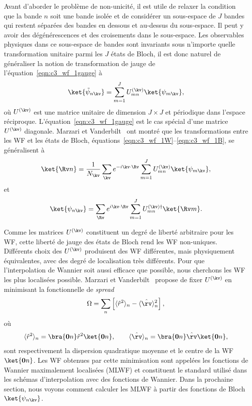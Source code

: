 Avant d'aborder le problème de non-unicité, il est utile de relaxer la condition que la bande $n$ soit une bande isolée et de considérer un sous-espace de $J$ bandes qui restent séparées des bandes en dessous et au-dessus du sous-espace. Il peut y avoir des dégénérescences et des croisements dans le sous-espace. Les observables physiques dans ce sous-espace de bandes sont invariants sous n'importe quelle transformation unitaire parmi les $J$ états de Bloch, il est donc naturel de généraliser la notion de transformation de jauge de l'équation~\eqref{eqn:c3_wf_1gauge} à
\begin{equation}
    \ket{\tilde{\psi}_{n\kv}}=\sum_{m=1}^J U_{mn}^{(\kv)}\ket{\psi_{m\kv}},
\end{equation}
où $U^{(\kv)}$ est une matrice unitaire de dimension $J\times J$ et périodique dans l'espace réciproque. L'équation~\eqref{eqn:c3_wf_1gauge} est le cas spécial d'une matrice $U^{(\kv)}$ diagonale. Marzari et Vanderbilt~\cite{marzariMaximallyLocalizedGeneralized1997} ont montré que les transformations entre les WF et les états de Bloch, équations~\eqref{eqn:c3_wf_1W}--\eqref{eqn:c3_wf_1B}, se généralisent à
\begin{equation}
    \ket{\Rv n} = \frac{1}{N_\kv}\sum_{\kv}e^{-i\kv\cdot\Rv}\sum_{m=1}^JU_{mn}^{(\kv)}\ket{\psi_{m\kv}},
\end{equation}
et
\begin{equation}
    \ket{\psi_{n\kv}}=\sum_{\Rv}e^{i\kv\cdot\Rv}\sum_{m=1}^J U_{mn}^{(\kv)\dag}\ket{\Rv m}.
\end{equation}

Comme les matrices $U^{(\kv)}$ constituent un degré de liberté arbitraire pour les WF, cette liberté de jauge des états de Bloch rend les WF non-uniques. Différents choix des $U^{(\kv)}$ produisent des WF différentes, mais physiquement équivalentes, avec des degré de localisation très différents. Pour que l'interpolation de Wannier soit aussi efficace que possible, nous cherchons les WF les plus localisées possible. Marzari et Vanderbilt~\cite{marzariMaximallyLocalizedGeneralized1997} propose de fixer $U^{(\kv)}$ en minimisant la fonctionnelle de \textit{spread}
\begin{equation}
    \Omega = \sum_n\left[\langle \hat{r}^2\rangle_n - \langle \hat{\rv} \rangle^2_n\right],
\end{equation}
où 
\begin{equation}
    \langle \hat{r}^2\rangle_n = \bra{\mathbf{0}n}\hat{r}^2\ket{\mathbf{0}n},\qquad\langle \hat{\rv} \rangle_n = \bra{\mathbf{0}n}\hat{\rv}\ket{\mathbf{0}n},
\end{equation}
sont respectivement la dispersion quadratique moyenne et le centre de la WF $\ket{\mathbf{0}n}$. Les WF obtenues par cette minimisation sont appelées les fonctions de Wannier maximalement localisées (MLWF) et constituent le standard utilisé dans les schémas d'interpolation avec des fonctions de Wannier. Dans la prochaine section, nous voyons comment calculer les MLWF à partir des fonctions de Bloch $\ket{\psi_{n\kv}}$.

